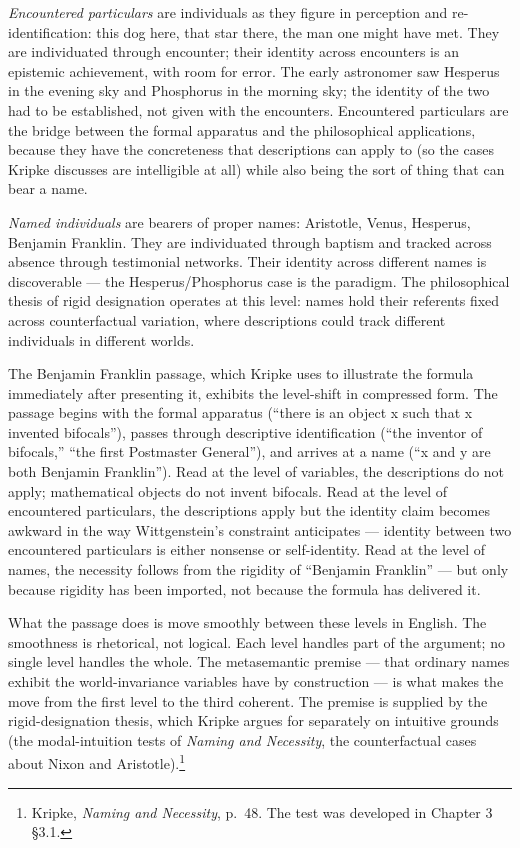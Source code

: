 \documentclass[12pt,a4paper]{article}
\begin{document}
\emph{Encountered particulars} are individuals as they figure in perception and re-identification: this dog here, that star there, the man one might have met. They are individuated through encounter; their identity across encounters is an epistemic achievement, with room for error. The early astronomer saw Hesperus in the evening sky and Phosphorus in the morning sky; the identity of the two had to be established, not given with the encounters. Encountered particulars are the bridge between the formal apparatus and the philosophical applications, because they have the concreteness that descriptions can apply to (so the cases Kripke discusses are intelligible at all) while also being the sort of thing that can bear a name.

\emph{Named individuals} are bearers of proper names: Aristotle, Venus, Hesperus, Benjamin Franklin. They are individuated through baptism and tracked across absence through testimonial networks. Their identity across different names is discoverable --- the Hesperus/Phosphorus case is the paradigm. The philosophical thesis of rigid designation operates at this level: names hold their referents fixed across counterfactual variation, where descriptions could track different individuals in different worlds.

The Benjamin Franklin passage, which Kripke uses to illustrate the formula immediately after presenting it, exhibits the level-shift in compressed form. The passage begins with the formal apparatus (``there is an object x such that x invented bifocals''), passes through descriptive identification (``the inventor of bifocals,'' ``the first Postmaster General''), and arrives at a name (``x and y are both Benjamin Franklin''). Read at the level of variables, the descriptions do not apply; mathematical objects do not invent bifocals. Read at the level of encountered particulars, the descriptions apply but the identity claim becomes awkward in the way Wittgenstein's constraint anticipates --- identity between two encountered particulars is either nonsense or self-identity. Read at the level of names, the necessity follows from the rigidity of ``Benjamin Franklin'' --- but only because rigidity has been imported, not because the formula has delivered it.

What the passage does is move smoothly between these levels in English. The smoothness is rhetorical, not logical. Each level handles part of the argument; no single level handles the whole. The metasemantic premise --- that ordinary names exhibit the world-invariance variables have by construction --- is what makes the move from the first level to the third coherent. The premise is supplied by the rigid-designation thesis, which Kripke argues for separately on intuitive grounds (the modal-intuition tests of \emph{Naming and Necessity}, the counterfactual cases about Nixon and Aristotle).\footnote{Kripke, \emph{Naming and Necessity}, p.~48. The test was developed in Chapter 3 §3.1.}
\end{document}
